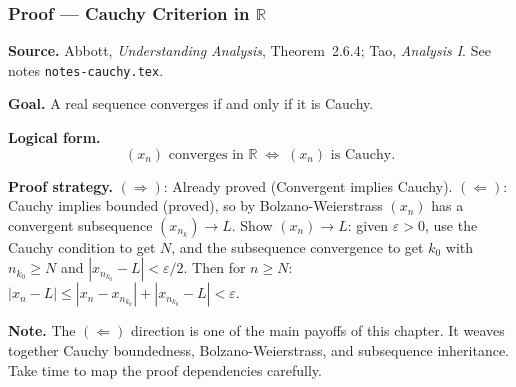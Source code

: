 
\clearpage
{}
\hypertarget{proof-RA-ABB-P-cauchy-criterion}{}

\subsubsection[Cauchy Criterion in $\mathbb{R}$]{Proof --- Cauchy Criterion in $\mathbb{R}$}

\bigskip

\noindent
\textbf{Source.}
Abbott, \emph{Understanding Analysis}, Theorem~2.6.4; Tao, \emph{Analysis I}.
See notes \texttt{notes-cauchy.tex}.

\vspace{0.75em}

\noindent
\textbf{Goal.}
A real sequence converges if and only if it is Cauchy.

\vspace{0.75em}

\noindent
\textbf{Logical form.}
\[
  (x_n) \text{ converges in } \mathbb{R}
  \;\iff\;
  (x_n) \text{ is Cauchy.}
\]

\vspace{0.75em}

\noindent
\textbf{Proof strategy.}
$(\Rightarrow)$: Already proved (Convergent implies Cauchy).
$(\Leftarrow)$: Cauchy implies bounded (proved), so by Bolzano-Weierstrass
$(x_n)$ has a convergent subsequence $(x_{n_k}) \to L$.
Show $(x_n) \to L$: given $\varepsilon > 0$, use the Cauchy condition to get
$N$, and the subsequence convergence to get $k_0$ with $n_{k_0} \ge N$ and
$|x_{n_{k_0}} - L| < \varepsilon/2$.
Then for $n \ge N$: $|x_n - L| \le |x_n - x_{n_{k_0}}| + |x_{n_{k_0}} - L| < \varepsilon$.

\vspace{0.75em}

\noindent
\textbf{Note.}
The $(\Leftarrow)$ direction is one of the main payoffs of this chapter.
It weaves together Cauchy boundedness, Bolzano-Weierstrass, and subsequence
inheritance. Take time to map the proof dependencies carefully.

\vspace{0.75em}

